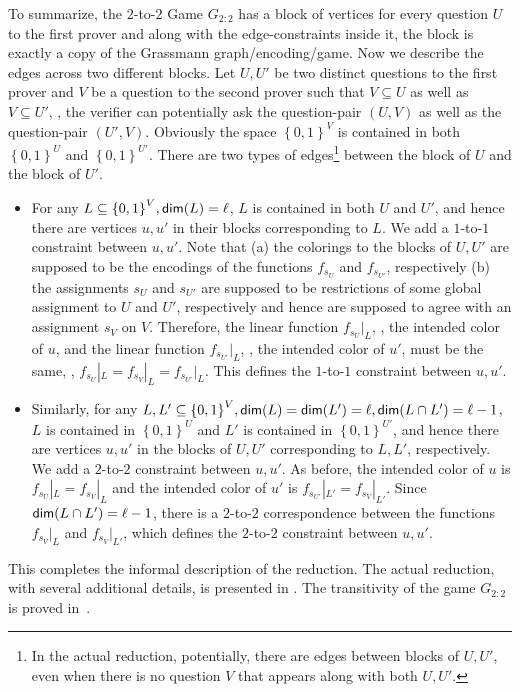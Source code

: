 \documentclass{toc}
\newcommand\set[1]{{\left\{ #1 \right\}}}
\newcommand\power[1]{\set{0,1}^{#1}}
\begin{document}
To summarize, the $2$-to-$2$ Game $G_{2:2}$ has a block of vertices for every question $U$ to the first prover  and along with the
edge-constraints inside it, the block is exactly a copy of the Grassmann graph/encoding/game. Now we describe the edges across
two different blocks. Let $U, U'$ be two distinct questions to the first prover and $V$ be a question to the second prover such that
$V \subseteq U$ as well as $V \subseteq U'$, \ie, the verifier can potentially ask the question-pair $(U, V)$ as well as the question-pair $(U', V)$.
Obviously the space $\power{V}$ is contained in both $\power{U}$ and $\power{U'}$. There are two types of edges\footnote{In the actual reduction,
potentially, there are edges between blocks of $U, U'$, even when there is no question $V$ that appears along with both $U, U'$.}
 between the block of
$U$ and  the block of $U'$.
\begin{itemize}
\item For any $L \subseteq \power{V}, {\sf dim}(L)=\ell$, $L$ is contained in
both $U$ and $U'$, and hence there are vertices $u, u'$ in their
blocks corresponding to $L$. We add a $1$-to-$1$ constraint between $u, u'$.
Note that (a) the colorings to the blocks of $U, U'$ are supposed to be the
encodings of the
%
functions $f_{s_U}$ and $f_{s_{U'}}$, respectively
%
(b) the assignments $s_U$ and $s_{U'}$ are supposed to be restrictions of some
global assignment to $U$ and $U'$, respectively %
and hence are supposed to
agree with an assignment $s_V$ on $V$. Therefore, the linear function $f_{s_U}|_L$,
\ie, the intended color of $u$, and the linear function $f_{s_{U'}}|_L$, \ie, the
intended color of $u'$, must be the same, \ie, $f_{s_U}|_L = f_{s_V}|_L = f_{s_{U'}}|_L$.
      This defines the $1$-to-$1$ constraint between $u, u'$.
\item Similarly, for any $L, L' \subseteq \power{V}, {\sf dim}(L)={\sf dim}(L')=\ell, {\sf dim}(L\cap L')=\ell-1$,
 $L$ is contained in $\power{U}$ and $L'$ is contained in $\power{U'}$, and hence there are vertices $u, u'$ in the blocks of $U, U'$ %
%
corresponding to $L, L'$, respectively.  We add a $2$-to-$2$ constraint between $u, u'$. As before,
       the intended color of $u$ is $f_{s_U}|_L = f_{s_V}|_L$ and the intended color of $u'$ is $f_{s_{U'}}|_{L'} = f_{s_V}|_{L'}$. Since
       ${\sf dim}(L \cap L')=\ell-1$, there is a $2$-to-$2$ correspondence between the functions $f_{s_V}|_L$ and $f_{s_V}|_{L'}$,
       which defines the $2$-to-$2$ constraint between $u, u'$.
\end{itemize}
This completes the informal description of the reduction. The actual reduction, with several additional details, is
presented in . The transitivity of the game $G_{2:2}$ is proved in~.
\end{document}
